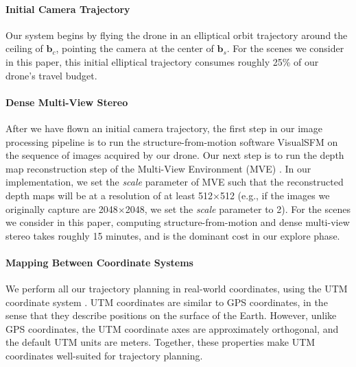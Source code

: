\vspace{-12pt}
\paragraph{Initial Camera Trajectory}
Our system begins by flying the drone in an elliptical orbit trajectory around the ceiling of $\mathbf{b}_c$, pointing the camera at the center of $\mathbf{b}_s$.
For the scenes we consider in this paper, this initial elliptical trajectory consumes roughly 25\% of our drone's travel budget.

\vspace{-12pt}
\paragraph{Dense Multi-View Stereo}
After we have flown an initial camera trajectory, the first step in our image processing pipeline is to run the structure-from-motion software VisualSFM \cite{wu:2013,wu:2007,wu:2011b,wu:2011a} on the sequence of images acquired by our drone.
Our next step is to run the depth map reconstruction step of the Multi-View Environment (MVE) \cite{fuhrmann:2015}.
In our implementation, we set the \emph{scale} parameter of MVE such that the reconstructed depth maps will be at a resolution of at least 512$\times$512 (e.g., if the images we originally capture are 2048$\times$2048, we set the \emph{scale} parameter to 2).
For the scenes we consider in this paper, computing structure-from-motion and dense multi-view stereo takes roughly 15 minutes, and is the dominant cost in our explore phase.

\vspace{-12pt}
\paragraph{Mapping Between Coordinate Systems}
We perform all our trajectory planning in real-world coordinates, using the UTM coordinate system \cite{usgs:2001}.
UTM coordinates are similar to GPS coordinates, in the sense that they describe positions on the surface of the Earth.
However, unlike GPS coordinates, the UTM coordinate axes are approximately orthogonal, and the default UTM units are meters.
Together, these properties make UTM coordinates well-suited for trajectory planning.



